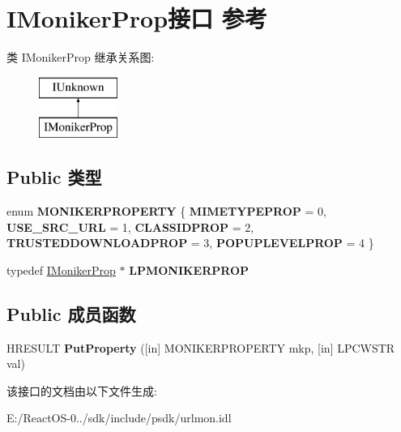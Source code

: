 \hypertarget{interface_i_moniker_prop}{}\section{I\+Moniker\+Prop接口 参考}
\label{interface_i_moniker_prop}
类 I\+Moniker\+Prop 继承关系图\+:\begin{figure}[H]
\begin{center}
\leavevmode
\includegraphics[height=2.000000cm]{interface_i_moniker_prop}
\end{center}
\end{figure}
\subsection*{Public 类型}
\begin{DoxyCompactItemize}
\item 
\mbox{\label{interface_i_moniker_prop_a658b57d0d285ccc8f8f3a9b978aae4f6}} 
enum {\bfseries M\+O\+N\+I\+K\+E\+R\+P\+R\+O\+P\+E\+R\+TY} \{ \newline
{\bfseries M\+I\+M\+E\+T\+Y\+P\+E\+P\+R\+OP} = 0, 
{\bfseries U\+S\+E\+\_\+\+S\+R\+C\+\_\+\+U\+RL} = 1, 
{\bfseries C\+L\+A\+S\+S\+I\+D\+P\+R\+OP} = 2, 
{\bfseries T\+R\+U\+S\+T\+E\+D\+D\+O\+W\+N\+L\+O\+A\+D\+P\+R\+OP} = 3, 
\newline
{\bfseries P\+O\+P\+U\+P\+L\+E\+V\+E\+L\+P\+R\+OP} = 4
 \}
\item 
\mbox{\label{interface_i_moniker_prop_ac17add1d2eab0feb142007ac584f1f05}} 
typedef \hyperlink{interface_i_moniker_prop}{I\+Moniker\+Prop} $\ast$ {\bfseries L\+P\+M\+O\+N\+I\+K\+E\+R\+P\+R\+OP}
\end{DoxyCompactItemize}
\subsection*{Public 成员函数}
\begin{DoxyCompactItemize}
\item 
\mbox{\label{interface_i_moniker_prop_a17a72df439383214428e84b69b6b8e03}} 
H\+R\+E\+S\+U\+LT {\bfseries Put\+Property} (\mbox{[}in\mbox{]} M\+O\+N\+I\+K\+E\+R\+P\+R\+O\+P\+E\+R\+TY mkp, \mbox{[}in\mbox{]} L\+P\+C\+W\+S\+TR val)
\end{DoxyCompactItemize}


该接口的文档由以下文件生成\+:\begin{DoxyCompactItemize}
\item 
E\+:/\+React\+O\+S-\/0../sdk/include/psdk/urlmon.\+idl\end{DoxyCompactItemize}
